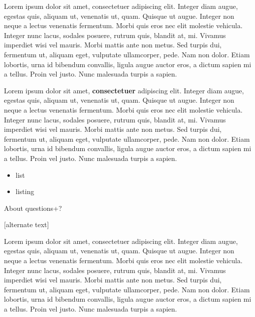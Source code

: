 \documentclass[small]{zmdocument}
\begin{document}
Lorem ipsum dolor sit amet, consectetuer adipiscing elit. Integer diam augue, egestas quis, aliquam ut, venenatis ut, quam. Quisque ut augue. Integer non neque a lectus venenatis fermentum. Morbi quis eros nec elit molestie vehicula. Integer nunc lacus, sodales posuere, rutrum quis, blandit at, mi. Vivamus imperdiet wisi vel mauris. Morbi mattis ante non metus. Sed turpis dui, fermentum ut, aliquam eget, vulputate ullamcorper, pede. Nam non dolor. Etiam lobortis, urna id bibendum convallis, ligula augue auctor eros, a dictum sapien mi a tellus. Proin vel justo. Nunc malesuada turpis a sapien.


Lorem ipsum dolor sit amet, \textbf{consectetuer} adipiscing elit. Integer diam augue, egestas quis, aliquam ut, venenatis ut, quam. Quisque ut augue. Integer non neque a lectus venenatis fermentum. Morbi quis eros nec elit molestie vehicula. Integer nunc lacus, sodales posuere, rutrum quis, blandit at, mi. Vivamus imperdiet wisi vel mauris. Morbi mattis ante non metus. Sed turpis dui, fermentum ut, aliquam eget, vulputate ullamcorper, pede. Nam non dolor. Etiam lobortis, urna id bibendum convallis, ligula augue auctor eros, a dictum sapien mi a tellus. Proin vel justo. Nunc malesuada turpis a sapien.


\begin{itemize}
\item\relax list
\item\relax listing
\end{itemize}

\begin{Question}
About questions+?
\end{Question}


[alternate text]

\begin{Quotation}[citation]
Lorem ipsum dolor sit amet, consectetuer adipiscing elit. Integer diam augue, egestas quis, aliquam ut, venenatis ut, quam. Quisque ut augue. Integer non neque a lectus venenatis fermentum. Morbi quis eros nec elit molestie vehicula. Integer nunc lacus, sodales posuere, rutrum quis, blandit at, mi. Vivamus imperdiet wisi vel mauris. Morbi mattis ante non metus. Sed turpis dui, fermentum ut, aliquam eget, vulputate ullamcorper, pede. Nam non dolor. Etiam lobortis, urna id bibendum convallis, ligula augue auctor eros, a dictum sapien mi a tellus. Proin vel justo. Nunc malesuada turpis a sapien.
\end{Quotation}

\horizontalLine
\end{document}
